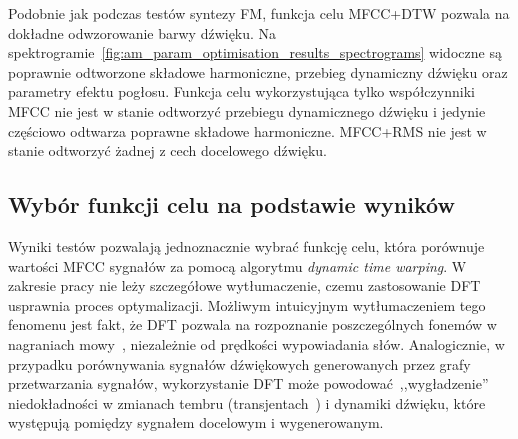 Podobnie jak podczas testów syntezy FM, funkcja celu MFCC+DTW pozwala na dokładne odwzorowanie barwy dźwięku.
Na spektrogramie~\ref{fig:am_param_optimisation_results_spectrograms} widoczne są poprawnie odtworzone
składowe harmoniczne, przebieg dynamiczny dźwięku oraz parametry efektu pogłosu. Funkcja celu wykorzystująca
tylko współczynniki MFCC nie jest w stanie odtworzyć przebiegu dynamicznego dźwięku i jedynie częściowo odtwarza
poprawne składowe harmoniczne. MFCC+RMS nie jest w stanie odtworzyć żadnej z cech docelowego dźwięku.

\subsection{Wybór funkcji celu na podstawie wyników}

Wyniki testów pozwalają jednoznacznie wybrać funkcję celu, która porównuje wartości MFCC
sygnałów za pomocą algorytmu \textit{dynamic time warping}. W zakresie pracy nie leży szczegółowe
wytłumaczenie, czemu zastosowanie DFT usprawnia proces optymalizacji. Możliwym intuicyjnym
wytłumaczeniem tego fenomenu jest fakt, że DFT pozwala na rozpoznanie poszczególnych
fonemów w nagraniach mowy~\cite{mfcc_dtw}, niezależnie od prędkości wypowiadania słów. 
Analogicznie, w przypadku porównywania sygnałów dźwiękowych generowanych przez grafy
przetwarzania sygnałów, wykorzystanie DFT może powodować~,,wygładzenie'' niedokładności
w zmianach tembru (transjentach~\cite{transient_music_theory}) i dynamiki dźwięku,
które występują pomiędzy sygnałem docelowym i wygenerowanym.

